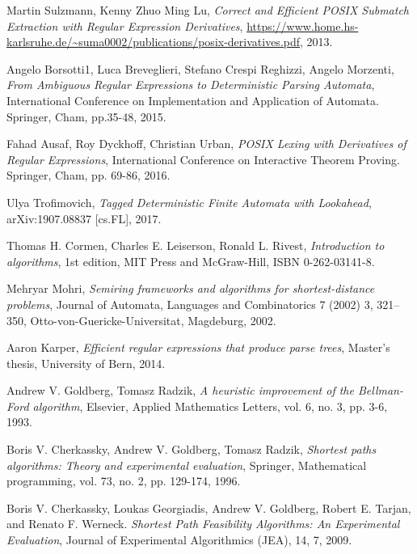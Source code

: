 \documentclass[AMA,STIX1COL]{WileyNJD-v2}
\begin{document}
\begin{thebibliography}{99}
    Martin Sulzmann, Kenny Zhuo Ming Lu,
    \textit{Correct and Efficient POSIX Submatch Extraction with Regular Expression Derivatives},
    \url{https://www.home.hs-karlsruhe.de/~suma0002/publications/posix-derivatives.pdf},
    2013.

    Angelo Borsotti1, Luca Breveglieri, Stefano Crespi Reghizzi, Angelo Morzenti,
    \textit{From Ambiguous Regular Expressions to Deterministic Parsing Automata},
    International Conference on Implementation and Application of Automata. Springer, Cham, pp.35-48,
    2015.

    Fahad Ausaf, Roy Dyckhoff, Christian Urban,
    \textit{POSIX Lexing with Derivatives of Regular Expressions},
    International Conference on Interactive Theorem Proving. Springer, Cham, pp. 69-86,
    2016.

    Ulya Trofimovich,
    \textit{Tagged Deterministic Finite Automata with Lookahead},
    arXiv:1907.08837 [cs.FL],
    2017.

    Thomas H. Cormen, Charles E. Leiserson, Ronald L. Rivest,
    \textit{Introduction to algorithms},
    1st edition,
    MIT Press and McGraw-Hill,
    ISBN 0-262-03141-8.

    Mehryar Mohri,
    \textit{Semiring frameworks and algorithms for shortest-distance problems},
    Journal of Automata, Languages and Combinatorics 7 (2002) 3, 321–350, Otto-von-Guericke-Universitat, Magdeburg,
    2002.

    Aaron Karper,
    \textit{Efficient regular expressions that produce parse trees},
    Master's thesis,
    University of Bern,
    2014.

    Andrew V. Goldberg, Tomasz Radzik,
    \textit{A heuristic improvement of the Bellman-Ford algorithm},
    Elsevier, Applied Mathematics Letters, vol. 6, no. 3, pp. 3-6,
    1993.

    Boris V. Cherkassky, Andrew V. Goldberg, Tomasz Radzik,
    \textit{Shortest paths algorithms: Theory and experimental evaluation},
    Springer, Mathematical programming, vol. 73, no. 2, pp. 129-174,
    1996.

    Boris V. Cherkassky, Loukas Georgiadis, Andrew V. Goldberg, Robert E. Tarjan, and Renato F. Werneck.
    \textit{Shortest Path Feasibility Algorithms: An Experimental Evaluation},
    Journal of Experimental Algorithmics (JEA), 14, 7,
    2009.


\end{thebibliography}
\end{document}
